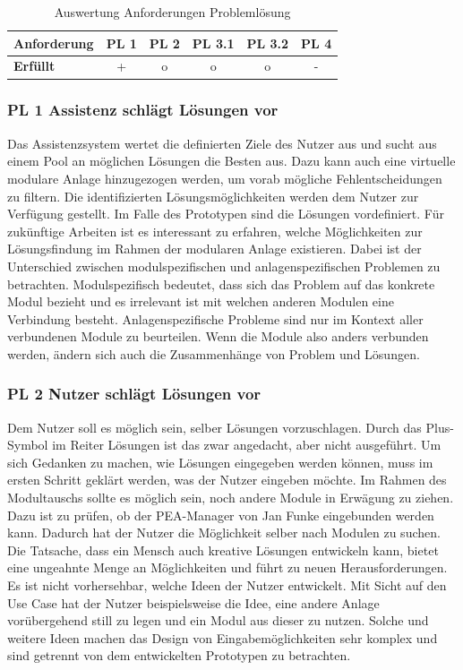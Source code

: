\begin{table}[htbp]
\caption{Auswertung Anforderungen Problemlösung}
\centering
\begin{tabular}{l|c|c|c|c|c}
\textbf{Anforderung} & PL 1 & PL 2 & PL 3.1 & PL 3.2 & PL 4 \\
\hline
\textbf{Erfüllt} & + & o & o & o & - \\
\end{tabular}
\label{tab:Anforderungen-Problemlösung}
\end{table}

\subsubsection*{PL 1 Assistenz schlägt Lösungen vor}
Das Assistenzsystem wertet die definierten Ziele des Nutzer aus und sucht aus einem Pool an möglichen Lösungen die Besten aus. Dazu kann auch eine virtuelle modulare Anlage hinzugezogen werden, um vorab mögliche Fehlentscheidungen zu filtern. Die identifizierten Lösungsmöglichkeiten werden dem Nutzer zur Verfügung gestellt. Im Falle des Prototypen sind die Lösungen vordefiniert. Für zukünftige Arbeiten ist es interessant zu erfahren, welche Möglichkeiten zur Lösungsfindung im Rahmen der modularen Anlage existieren. Dabei ist der Unterschied zwischen modulspezifischen und anlagenspezifischen Problemen zu betrachten. Modulspezifisch bedeutet, dass sich das Problem auf das konkrete Modul bezieht und es irrelevant ist mit welchen anderen Modulen eine Verbindung besteht. Anlagenspezifische Probleme sind nur im Kontext aller verbundenen Module zu beurteilen. Wenn die Module also anders verbunden werden, ändern sich auch die Zusammenhänge von Problem und Lösungen.

\subsubsection*{PL 2 Nutzer schlägt Lösungen vor}
Dem Nutzer soll es möglich sein, selber Lösungen vorzuschlagen. Durch das Plus-Symbol im Reiter Lösungen ist das zwar angedacht, aber nicht ausgeführt. Um sich Gedanken zu machen, wie Lösungen eingegeben werden können, muss im ersten Schritt geklärt werden, was der Nutzer eingeben möchte. Im Rahmen des Modultauschs sollte es möglich sein, noch andere Module in Erwägung zu ziehen. Dazu ist zu prüfen, ob der PEA-Manager von Jan Funke \cite{Funke2018} eingebunden werden kann. Dadurch hat der Nutzer die Möglichkeit selber nach Modulen zu suchen. Die Tatsache, dass ein Mensch auch kreative Lösungen entwickeln kann, bietet eine ungeahnte Menge an Möglichkeiten und führt zu neuen Herausforderungen. Es ist nicht vorhersehbar, welche Ideen der Nutzer entwickelt. Mit Sicht auf den Use Case hat der Nutzer beispielsweise die Idee, eine andere Anlage vorübergehend still zu legen und ein Modul aus dieser zu nutzen. Solche und weitere Ideen machen das Design von Eingabemöglichkeiten sehr komplex und sind getrennt von dem entwickelten Prototypen zu betrachten.

